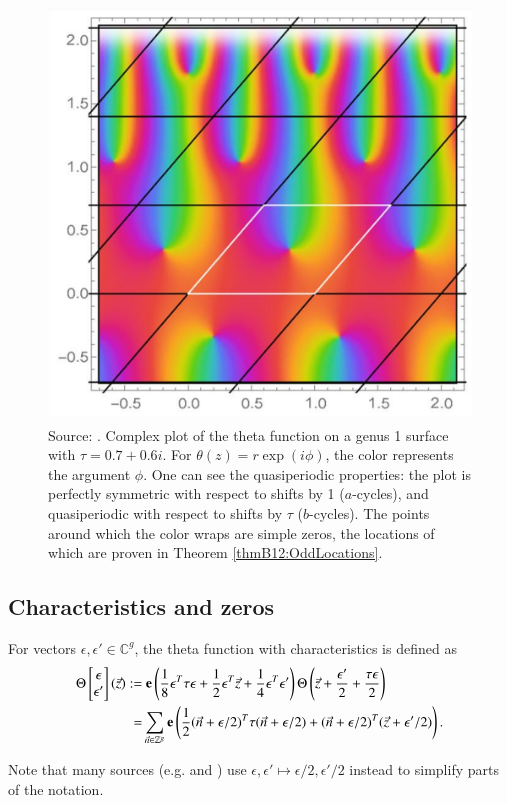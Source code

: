 \begin{figure}
    \center
    \includegraphics{assetsB12/genus1theta.png}
    \caption{Source: \cite{Cha22}.
    Complex plot of the theta function on a genus 1 surface with $\tau = 0.7+0.6i$. For $\theta(z)=r\exp(i\phi)$, the color represents the argument $\phi$. One can see the quasiperiodic properties: the plot is perfectly symmetric with respect to shifts by 1 ($a$-cycles), and quasiperiodic with respect to shifts by $\tau$ ($b$-cycles). The points around which the color wraps are simple zeros, the locations of which are proven in Theorem \ref{thmB12:OddLocations}.}
    \label{figB12:Genus1theta}
\end{figure}

\subsection{Characteristics and zeros}
\begin{definition}
    For vectors $\epsilon,\epsilon' \in \mathbb C^g$, the theta function with characteristics is defined as
    \begin{align}
        \Theta\begin{bmatrix} \epsilon \\  \epsilon'\end{bmatrix}(\vec z) :=& \ 
        \bolde\left(\frac{1}{8}\epsilon^T \tau \epsilon + \frac{1}{2}\epsilon^T \vec z + \frac{1}{4}\epsilon^T  \epsilon'\right)
        \Theta\left(\vec z + \frac{\epsilon'}{2}+\frac{\tau\epsilon}{2}\right)
       \\ =& \sum_{\vec n \in \mathbb Z^g} \bolde\left(\frac{1}{2} (\vec n+\epsilon/2)^T \tau (\vec n+\epsilon/2) + (\vec n+\epsilon/2)^T (\vec z+\epsilon'/2)\right).
    \end{align}

    Note that many sources (e.g. \cite{Cha22} and \cite{ComputationalSchottky}) use $\epsilon,\epsilon' \mapsto \epsilon/2,\epsilon'/2$ instead to simplify parts of the notation.
\end{definition}


